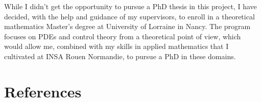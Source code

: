 \documentclass[
  american,
]{article}
\begin{document}
While I didn't get the opportunity to pursue a PhD thesis in this project,
I have decided, with the help and guidance of my supervisors, to enroll in a
theoretical mathematics Master's degree at University of Lorraine in Nancy.
The program focuses on PDEs and control theory from a theoretical point of view,
which would allow me, combined with my skills in applied mathematics that
I cultivated at INSA Rouen Normandie, to pursue a PhD in these domains.

\pagebreak

\hypertarget{references}{%
\section*{References}\label{references}}

\hypertarget{refs}{}
\end{document}
